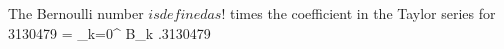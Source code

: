 The  Bernoulli number $ is defined as !$ times the  coefficient in the Taylor series for
3130479 = \sum_{k=0}^{\infty} B_k .3130479

